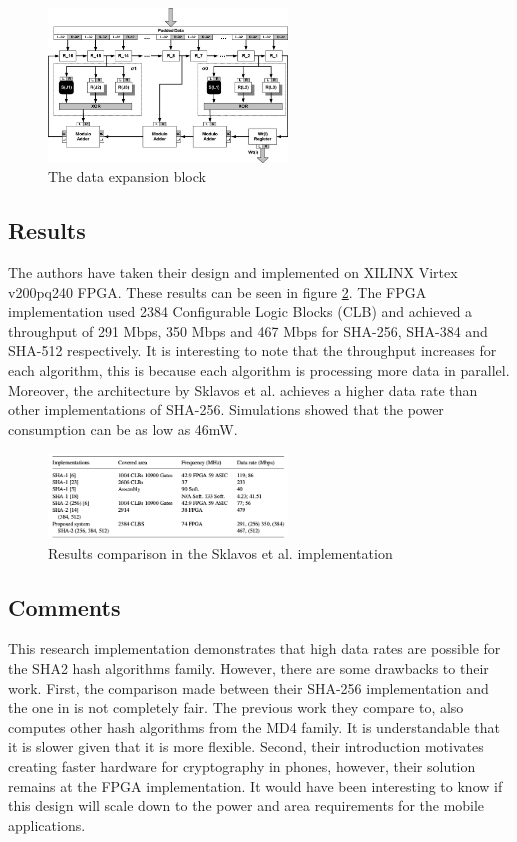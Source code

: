 \documentclass[conference]{IEEEtran}
\begin{document}
\begin{figure}[!t]
\centering
\includegraphics[width=2.5in]{dbesklav}
\caption{The data expansion block }
\label{fig:dbesklav}
\end{figure}

\subsection{Results}
The authors have taken their design and implemented on XILINX Virtex v200pq240 FPGA. These results can be seen in figure \ref{fig:compsklav}. The FPGA implementation used 2384 Configurable Logic Blocks (CLB) and achieved a throughput of 291 Mbps, 350 Mbps and 467 Mbps for SHA-256, SHA-384 and SHA-512 respectively. It is interesting to note that the throughput increases for each algorithm, this is because each algorithm is processing more data in parallel. Moreover, the architecture by Sklavos et al. achieves a higher data rate than other implementations of SHA-256. Simulations showed that the power consumption can be as low as 46mW.

\begin{figure}[!t]
\centering
\includegraphics[width=2.5in]{compsklav}
\caption{Results comparison in the Sklavos et al. implementation}
\label{fig:compsklav}
\end{figure}

\subsection{Comments}
This research implementation demonstrates that high data rates are possible for the SHA2 hash algorithms family. However, there are some drawbacks to their work. First, the comparison made between their SHA-256 implementation and the one in \cite{md4} is not completely fair. The previous work they compare to, also computes other hash algorithms from the MD4 family. It is understandable that it is slower given that it is more flexible. Second, their introduction motivates creating faster hardware for cryptography in phones, however, their solution remains at the FPGA implementation. It would have been interesting to know if this design will scale down to the power and area requirements for the mobile applications.
\end{document}
